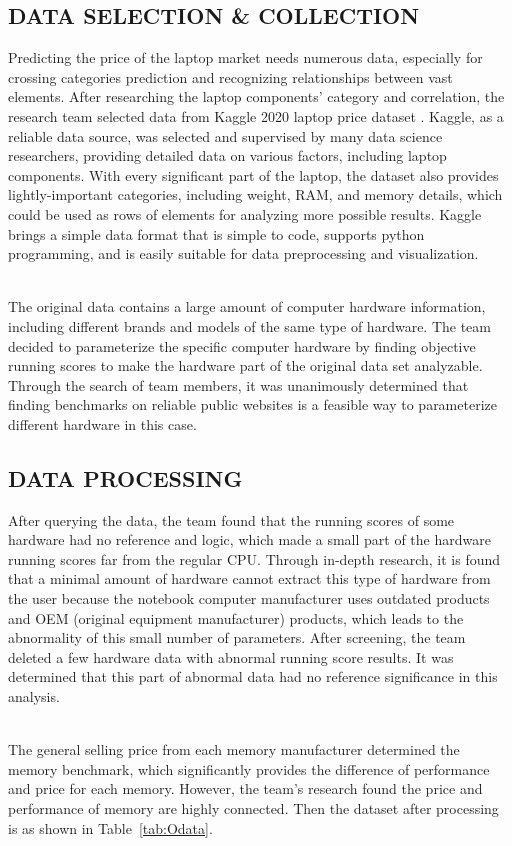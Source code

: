 \documentclass{scrartcl}
\begin{document}
\subsection{DATA SELECTION & COLLECTION }
Predicting the price of the laptop market needs numerous data, especially for crossing categories prediction and recognizing relationships between vast elements. After researching the laptop components’ category and correlation, the research team selected data from Kaggle 2020 laptop price dataset \cite{kumar_2022}. Kaggle, as a reliable data source, was selected and supervised by many data science researchers, providing detailed data on various factors, including laptop components. With every significant part of the laptop, the dataset also provides lightly-important categories, including weight, RAM, and memory details, which could be used as rows of elements for analyzing more possible results. Kaggle brings a simple data format that is simple to code, supports python programming, and is easily suitable for data preprocessing and visualization. \par

~\\
\noindent The original data contains a large amount of computer hardware information, including different brands and models of the same type of hardware. The team decided to parameterize the specific computer hardware by finding objective running scores to make the hardware part of the original data set analyzable. Through the search of team members, it was unanimously determined that finding benchmarks \cite{passmark} on reliable public websites is a feasible way to parameterize different hardware in this case. 


\subsection{DATA PROCESSING}
After querying the data, the team found that the running scores of some hardware had no reference and logic, which made a small part of the hardware running scores far from the regular CPU. Through in-depth research, it is found that a minimal amount of hardware cannot extract this type of hardware from the user because the notebook computer manufacturer uses outdated products and OEM (original equipment manufacturer) products, which leads to the abnormality of this small number of parameters. After screening, the team deleted a few hardware data with abnormal running score results. It was determined that this part of abnormal data had no reference significance in this analysis.\par
~\\
\noindent The general selling price from each memory manufacturer determined the memory benchmark, which significantly provides the difference of performance and price for each memory. However, the team's research found the price and performance of memory are highly connected. Then the dataset after processing is as shown in Table~\ref{tab:Odata}.
~\\
\end{document}
